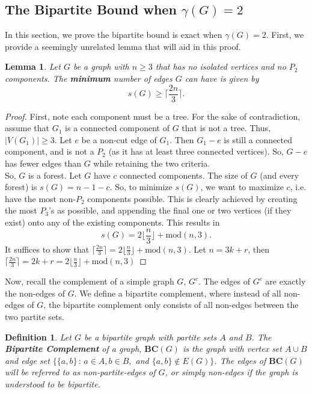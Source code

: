 \documentclass[12pt]{amsart}
\newtheorem{lemma}[thm]{Lemma}
\newtheorem{defn}[thm]{Definition}
\begin{document}
\subsection{The Bipartite Bound when $\gamma(G) = 2$}\label{sect:g=2}
In this section, we prove the bipartite bound is exact when $\gamma(G) = 2$. First, we provide a seemingly unrelated lemma that will aid in this proof.
\begin{lemma}\label{lma:MinEdgesForest}
Let $G$ be a graph with $n \geq 3$ that has no isolated vertices and no $P_2$ components. The \textbf{minimum} number of edges $G$ can have is given by $$s(G) \geq \Big\lceil\frac{2n}{3}\Big\rceil.$$
\end{lemma}
\begin{proof}
    First, note each component must be a tree. For the sake of contradiction, assume that $G_1$ is a connected component of $G$ that is not a tree. Thus, $|V(G_1)| \geq 3$. Let $e$ be a non-cut edge of $G_1$. Then $G_1 - e$ is still a connected component, and is not a $P_2$ (as it has at least three connected vertices). So, $G-e$ has fewer edges than $G$ while retaining the two criteria.\\
    So, $G$ is a forest. Let $G$ have $c$ connected components. The size of $G$ (and every forest) is $s(G) = n - 1 - c$. So, to minimize $s(G)$, we want to maximize $c$, i.e. have the most non-$P_2$ components possible. This is clearly achieved by creating the most $P_3$'s as possible, and appending the final one or two vertices (if they exist) onto any of the existing components. This results in $$s(G) = 2\lfloor\frac{n}{3}\rfloor + \text{mod}(n,3).$$
    It suffices to show that $\lceil\frac{2n}{3}\rceil = 2\lfloor\frac{n}{3}\rfloor + \text{mod}(n,3)$. Let $n = 3k + r$, then $\lceil\frac{2n}{3}\rceil = 2k + r = 2\lfloor\frac{n}{3}\rfloor + \text{mod}(n,3)$
 \end{proof}
 Now, recall the complement of a simple graph $G$, $G^c$. The edges of $G^c$ are exactly the non-edges of $G$. We define a bipartite complement, where instead of all non-edges of $G$, the bipartite complement only consists of all non-edges between the two partite sets.
 \begin{defn}\label{def:NonEdges}
     Let $G$ be a bipartite graph with partite sets $A$ and $B$. The \textbf{Bipartite Complement} of a graph, $\mathbf{BC}(G)$ is the graph with vertex set $A \cup B$ and edge set $\Big\{\{a,b\}\,:\,a\in A, b\in B, $ and $\{a,b\}\notin E(G)\Big\}$. The edges of $\mathbf{BC}(G)$ will be referred to as non-partite-edges of $G$, or simply non-edges if the graph is understood to be bipartite.
 \end{defn}
\end{document}
